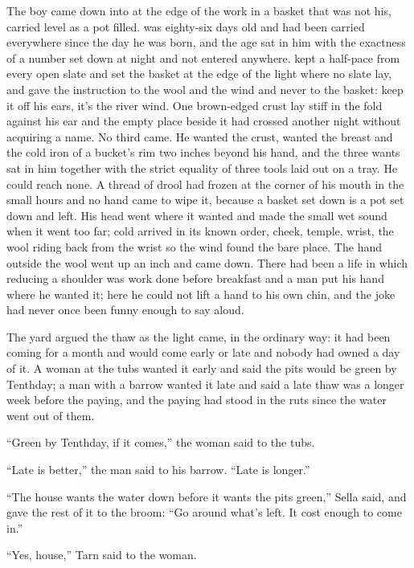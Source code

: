 The boy came down into  at the edge of the work in a basket that was not his, carried level as a pot filled.  was eighty-six days old and had been carried everywhere since the day he was born, and the age sat in him with the exactness of a number set down at night and not entered anywhere.  kept a half-pace from every open slate and set the basket at the edge of the light where no slate lay, and gave the instruction to the wool and the wind and never to the basket: keep it off his ears, it’s the river wind. One brown-edged crust lay stiff in the fold against his ear and the empty place beside it had crossed another night without acquiring a name. No third came. He wanted the crust, wanted the breast and the cold iron of a bucket’s rim two inches beyond his hand, and the three wants sat in him together with the strict equality of three tools laid out on a tray. He could reach none. A thread of drool had frozen at the corner of his mouth in the small hours and no hand came to wipe it, because a basket set down is a pot set down and left. His head went where it wanted and made the small wet sound when it went too far; cold arrived in its known order, cheek, temple, wrist, the wool riding back from the wrist so the wind found the bare place. The hand outside the wool went up an inch and came down. There had been a life in which reducing a shoulder was work done before breakfast and a man put his hand where he wanted it; here he could not lift a hand to his own chin, and the joke had never once been funny enough to say aloud.

\scenebreak

The yard argued the thaw as the light came, in the ordinary way: it had been coming for a month and would come early or late and nobody had owned a day of it. A woman at the tubs wanted it early and said the pits would be green by Tenthday; a man with a barrow wanted it late and said a late thaw was a longer week before the paying, and the paying had stood in the ruts since the water went out of them.

“Green by Tenthday, if it comes,” the woman said to the tubs.

“Late is better,” the man said to his barrow. “Late is longer.”

“The house wants the water down before it wants the pits green,” Sella said, and gave the rest of it to the broom: “Go around what’s left. It cost enough to come in.”

“Yes, house,” Tarn said to the woman.

